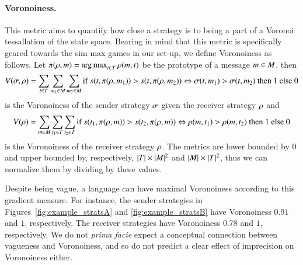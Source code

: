 
\paragraph{Voronoiness.}
This metric aims to quantify how close a strategy is to being a part
of a Voronoi tessallation of the state space. Bearing in mind that
this metric is specifically geared towards the sim-max games in our
set-up, we define Voronoiness as follows. Let $\pi(\rho, m) =
\operatorname*{arg\,max}_{t \in T}\rho(m,t)$ be the prototype
of a message $m \in M$, then
\begin{multline*}
  V(\sigma, \rho) = \sum_{t \in T} \sum_{m_1 \in
    M} \sum_{m_2 \in M} \textrm{if } s(t,
  \pi(\rho, m_1)) > s(t, \pi(\rho, m_2)) \Leftrightarrow
  \sigma(t, m_1) > \sigma(t, m_2) \textrm{ then
  } 1 \textrm{ else } 0 
\end{multline*}
is the Voronoiness of the sender strategy $\sigma$ given the receiver
strategy $\rho$ and
\begin{align*}
  V(\rho) = \sum_{m \in M} \sum_{t_1 \in T}
  \sum_{t_2 \in T} \textrm{if } s(t_1, \pi(\rho,
  m)) > s(t_2, \pi(\rho, m)) \Leftrightarrow \rho(m,
  t_1) > \rho(m, t_2) \textrm{ then } 1 \textrm{
    else } 0
\end{align*}
is the Voronoiness of the receiver strategy $\rho$.  The metrics
are lower bounded by $0$ and upper bounded by, respectively,
$|T| \times |M|^2$ and $|M| \times |T|^2$,
thus we can normalize them by dividing by these values.

Despite being vague, a language can have maximal Voronoiness according
to this gradient measure. For instance, the sender strategies in
Figures~\ref{fig:example_stratsA} and \ref{fig:example_stratsB} have
Voronoiness $0.91$ and $1$, respectively. The receiver strategies have
Voronoiness $0.78$ and $1$, respectively. We do not \emph{prima facie}
expect a conceptual connection between vagueness and Voronoiness, and
so do not predict a clear effect of imprecision on Voronoiness either.

